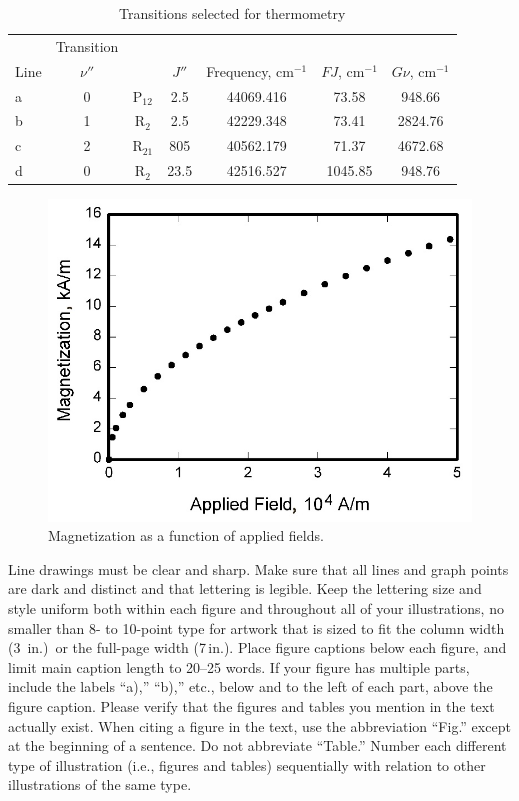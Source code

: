 \documentclass[journal ]{new-aiaa}
\begin{document}
\begin{table}[hbt!]
\caption{\label{tab:table1} Transitions selected for thermometry}
\centering
\begin{tabular}{lcccccc}
\hline
& Transition& & \multicolumn{2}{c}{}\\\cline{2-2}
Line& $\nu''$& & $J'' $& Frequency, cm$^{-1}$& $FJ$, cm$^{-1}$& $G\nu $, cm$^{-1}$\\\hline
a& 0& P$_{12}$& 2.5& 44069.416& 73.58& 948.66\\
b& 1& R$_{2}$& 2.5& 42229.348& 73.41& 2824.76\\
c& 2& R$_{21}$& 805& 40562.179& 71.37& 4672.68\\
d& 0& R$_{2}$& 23.5& 42516.527& 1045.85& 948.76\\
\hline
\end{tabular}
\end{table}


\begin{figure}[hbt!]
\centering
\includegraphics[width=.5\textwidth]{graph}
\caption{Magnetization as a function of applied fields.}
\end{figure}

Line drawings must be clear and sharp. Make sure that all lines and graph points are dark and distinct and that lettering is legible. Keep the lettering size and style uniform both within each figure and throughout all of your illustrations, no smaller than 8- to 10-point type for artwork that is sized to fit the column width (3\,\textonequarter{} in.)~or the full-page width (7\,in.). Place figure captions below each figure, and limit main caption length to 20--25 words. If your figure has multiple parts, include the labels “a),” “b),” etc., below and to the left of each part, above the figure caption. Please verify that the figures and tables you mention in the text actually exist. When citing a figure in the text, use the abbreviation “Fig.” except at the beginning of a sentence. Do not abbreviate “Table.” Number each different type of illustration (i.e., figures and tables) sequentially with relation to other illustrations of the same type.
\end{document}
